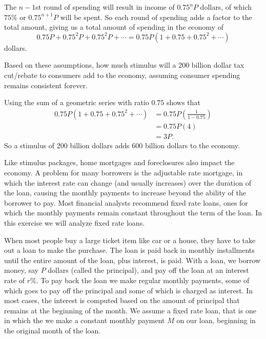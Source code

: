 \begin{exercises}
\begin{exerciseSolution}
The $n-1$st round of spending will result in income of $0.75^nP$ dollars, of which $75\%$ or $0.75^{n+1}P$ will be spent. So each round of spending adds a factor to the total amount, giving us a total amount of spending in the economy of
\[0.75P + 0.75^2P + 0.75^2P + \cdots = 0.75P(1+0.75+0.75^2+ \cdots )\]
dollars.

\end{exerciseSolution}

    \item Based on these assumptions, how much stimulus will a 200 billion dollar tax cut/rebate to consumers add to the economy, assuming consumer spending remains consistent forever.

\begin{exerciseSolution}

Using the sum of a geometric series with ratio $0.75$ shows that
\begin{align*}
0.75P(1+0.75+0.75^2+ \cdots ) &= 0.75P\left( \frac{1}{1-0.75} \right) \\
        &= 0.75P(4) \\
        &= 3P.
\end{align*}
So a stimulus of 200 billion dollars adds 600 billion dollars to the economy.

\end{exerciseSolution}

    \ea


\item Like stimulus packages, home mortgages and foreclosures also impact the economy. A problem for many borrowers is the adjustable rate mortgage, in which the interest rate can change (and usually increases) over the duration of the loan, causing the monthly payments to increase beyond the ability of the borrower to pay. Most financial analysts recommend fixed rate loans, ones for which the monthly payments remain constant throughout the term of the loan. In this exercise we will analyze fixed rate loans.

    When most people buy a large ticket item like car or a house, they have to take out a loan to make the purchase. The loan is paid back in monthly installments until the entire amount of the loan, plus interest, is paid. With a loan, we borrow money, say $P$ dollars (called the principal), and pay off the loan at an interest rate of $r$\%. To pay back the loan we make regular monthly payments, some of which goes to pay off the principal and some of which is charged as interest. In most cases, the interest is computed based on the amount of principal that remains at the beginning of the month. We assume a fixed rate loan, that is one in which the we make a constant monthly payment $M$ on our loan, beginning in the original month of the loan.


\end{exercises}
